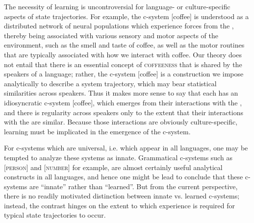 The necessity of learning is uncontroversial for language- or culture-specific aspects of state trajectories. For example, the c-system [coffee] is understood as a distributed network of neural populations which experience forces from the  , thereby being associated with various sensory and motor aspects of the environment, such as the smell and taste of coffee, as well as the motor routines that are typically associated with how we interact with coffee. Our theory does not entail that there is an essential concept of \textsc{coffeeness} that is shared by the speakers of a language; rather, the c-system [coffee] is a construction we impose analytically to describe a system trajectory, which may bear statistical similarities across speakers. Thus it makes more sense to say that each  has an idiosyncratic c-system [coffee], which emerges from their interactions with the , and there is regularity across speakers only to the extent that their interactions with the  are similar. Because those interactions are obviously culture-specific, learning must be implicated in the emergence of the c-system.

For c-systems which are universal, i.e. which appear in all languages, one may be tempted to analyze these systems as innate. Grammatical c-systems such as [\textsc{person}] and [\textsc{number}] for example, are almost certainly useful analytical constructs in all languages, and hence one might be lead to conclude that these c-systems are “innate” rather than “learned”. But from the current perspective, there is no readily motivated distinction between innate vs. learned c-systems; instead, the contrast hinges on the extent to which experience is required for typical state trajectories to occur. 

